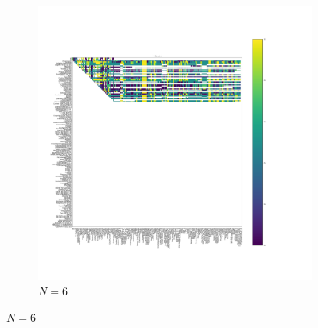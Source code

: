 \documentclass{article}
\begin{document}
\begin{figure}[!hbtp]
    \begin{subfigure}[t]{.3\textwidth}
        \centering
        \includegraphics[width=.8\textwidth]{../img/fixation_heatmap_6_noise.pdf}
        \caption{\(N=6\)}
    \end{subfigure}%


\end{figure}
\end{document}
